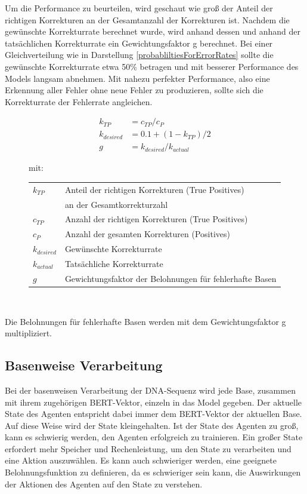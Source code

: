 \documentclass[oneside,bibliography=totocnumbered,BCOR=5mm]{scrbook}%
\makeatletter
\theoremstyle{definition}
\theoremstyle{definition}
\theoremstyle{definition}
\theoremstyle{definition}
\theoremstyle{definition}
\theoremstyle{definition}
\newenvironment{conditions}[1][mit:]
  {#1 \begin{tabular}[t]{>{$}l<{$} @{${}={}$} l}}
  {\end{tabular}\\[\belowdisplayskip]}
\makeatother
\begin{document}
Um die Performance zu beurteilen, wird geschaut wie groß der Anteil der richtigen Korrekturen
an der Gesamtanzahl der Korrekturen ist. Nachdem die gewünschte Korrekturrate berechnet wurde,
wird anhand dessen und anhand der tatsächlichen Korrekturrate ein Gewichtungsfaktor g berechnet.
Bei einer Gleichverteilung wie in Darstellung \ref{probabliltiesForErrorRates} sollte die gewünschte 
Korrekturrate etwa 50\% betragen und mit besserer Performance des Models langsam abnehmen. 
Mit nahezu perfekter Performance, also eine Erkennung aller Fehler ohne neue Fehler zu produzieren,
sollte sich die Korrekturrate der Fehlerrate angleichen.\\

\begin{figure}[h]
  \begin{align*}
    k_{TP} &= c_{TP} / c_{P} \\
    k_{desired} &= 0.1 + (1 - k_{TP} ) / 2 \\
    g &= k_{desired} / k_{actual}
  \end{align*} 
  
  \begin{conditions}
    k_{TP}      & Anteil der richtigen Korrekturen (True Positives) \\
                & an der Gesamtkorrekturzahl \\
    c_{TP}      & Anzahl der richtigen Korrekturen (True Positives) \\
    c_{P}       & Anzahl der gesamten Korrekturen (Positives) \\
    k_{desired} & Gewünschte Korrekturrate \\
    k_{actual}  & Tatsächliche Korrekturrate \\
    g           & Gewichtungsfaktor der Belohnungen für fehlerhafte Basen
  \end{conditions}
  
  \end{figure}

Die Belohnungen für fehlerhafte Basen werden mit dem Gewichtungsfaktor g multipliziert.



\subsection{Basenweise Verarbeitung}
Bei der basenweisen Verarbeitung der DNA-Sequenz wird jede Base, zusammen mit ihrem zugehörigen BERT-Vektor, 
einzeln in das Model gegeben.
Der aktuelle State des Agenten entspricht dabei immer dem BERT-Vektor der aktuellen Base. 
Auf diese Weise wird der State kleingehalten. Ist der State des Agenten zu groß, kann es schwierig werden, 
den Agenten erfolgreich zu trainieren. Ein großer State erfordert mehr Speicher und Rechenleistung, 
um den State zu verarbeiten und eine Aktion auszuwählen. 
Es kann auch schwieriger werden, eine geeignete Belohnungsfunktion zu definieren, 
da es schwieriger sein kann, die Auswirkungen der Aktionen des Agenten auf den State zu verstehen.\\
\end{document}
